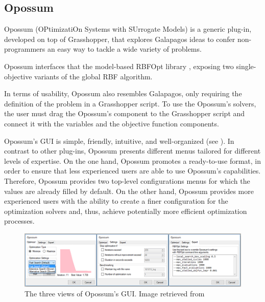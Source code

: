 	\subsection{Opossum}
	Opossum (OPtimizatiOn Systems with SUrrogate Models) \cite{Wortmann2017Opossum} is a generic plug-in, developed on top of Grasshopper, that explores Galapagos ideas to confer non-programmers an easy way to tackle a wide variety of problems.
	
	Opossum interfaces that the model-based RBFOpt library \cite{RBFOPT}, exposing two single-objective variants of the global \ac{RBF} algorithm. 
	
	In terms of usability, Opossum also resembles Galapagos, only requiring the definition of the problem in a Grasshopper script. To use the Opossum's solvers, the user must drag the Opossum's component to the Grasshopper script and connect it with the variables and the objective function components.
	
	Opossum's \ac{GUI} is simple, friendly, intuitive, and well-organized (see ). In contrast to other plug-ins, Opossum presents different menus tailored for different levels of expertise. On the one hand, Opossum promotes a ready-to-use format, in order to ensure that less experienced users are able to use Opossum's capabilities. Therefore, Opossum provides two top-level configurations menus for which the values are already filled by default. On the other hand, Opossum provides more experienced users with the ability to create a finer configuration for the optimization solvers and, thus, achieve potentially more efficient optimization processes. 
	
	\begin{figure}
		\centering
		\includegraphics[width=1\textwidth]{Images/Background/Opossum/opossum_1.png}
		\caption[Opossum GUI]{The three views of Opossum's \ac{GUI}. Image retrieved from~\cite{Wortmann2017Opossum}}
		\label{fig:opossum}
	\end{figure}
	
